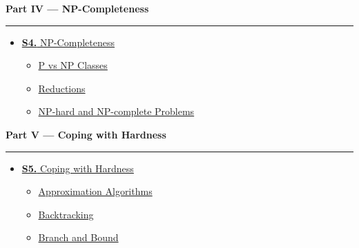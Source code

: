 \documentclass[12pt]{article}
\begin{document}
\begin{tcolorbox}[breakable,colback=cD!5,colframe=cD,boxrule=1pt,arc=5pt,
  left=8pt,right=8pt,top=8pt,bottom=8pt,before skip=4pt]
  {\large\bfseries\textcolor{cD}{Part IV --- NP-Completeness}}\par\smallskip
  \noindent\textcolor{cD!40}{\rule{\textwidth}{0.4pt}}\par\smallskip
  \small\begin{itemize}[leftmargin=1.2em,itemsep=1pt,label={\textcolor{cD}{$\triangleright$}}]
    \item \hyperref[sec:S4]{\textbf{S4.} NP-Completeness}
      \begin{itemize}[leftmargin=1.5em,itemsep=0pt,label={\textcolor{cD}{$\cdot$}}]
        \item \hyperref[sub:s4-pvsnp]{P vs NP Classes}
        \item \hyperref[sub:s4-reductions]{Reductions}
        \item \hyperref[sub:s4-nphard]{NP-hard and NP-complete Problems}
      \end{itemize}
  \end{itemize}
\end{tcolorbox}

\begin{tcolorbox}[breakable,colback=cE!5,colframe=cE,boxrule=1pt,arc=5pt,
  left=8pt,right=8pt,top=8pt,bottom=8pt,before skip=4pt]
  {\large\bfseries\textcolor{cE}{Part V --- Coping with Hardness}}\par\smallskip
  \noindent\textcolor{cE!40}{\rule{\textwidth}{0.4pt}}\par\smallskip
  \small\begin{itemize}[leftmargin=1.2em,itemsep=1pt,label={\textcolor{cE}{$\triangleright$}}]
    \item \hyperref[sec:S5]{\textbf{S5.} Coping with Hardness}
      \begin{itemize}[leftmargin=1.5em,itemsep=0pt,label={\textcolor{cE}{$\cdot$}}]
        \item \hyperref[sub:s5-approx]{Approximation Algorithms}
        \item \hyperref[sub:s5-backtrack]{Backtracking}
        \item \hyperref[sub:s5-branchbound]{Branch and Bound}
      \end{itemize}
  \end{itemize}
\end{tcolorbox}
\end{document}
